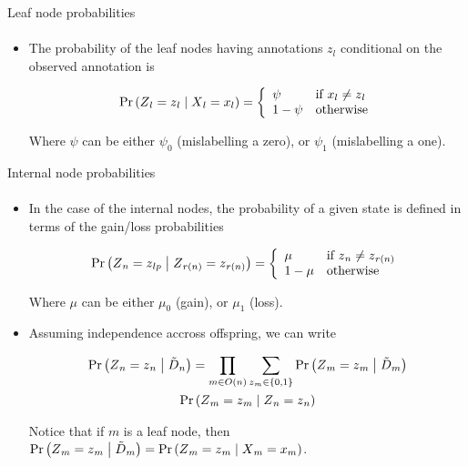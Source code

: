 \documentclass[9pt,handout,ignorenonframetext,]{beamer}
\newcommand{\Prcond}[2]{{\mbox{Pr}\left(#1\vphantom{#2}\;\right|\left.\vphantom{#1}#2\right)}}
\newcommand{\aphylo}{D{}}      %
\newcommand{\aphyloObs}{\tilde \aphylo{}} %
\newcommand{\Ann}{Z{}} %
\newcommand{\ann}{z{}} %
\newcommand{\AnnObs}{X{}}
\newcommand{\annObs}{x{}}
\begin{document}
\begin{frame}[t,label=leafnodesprob]{Leaf node probabilities}

\framesubtitle{\hyperlink{peelingalgorithm}{}}

\begin{itemize}
\item
  The probability of the leaf nodes having annotations \(\ann_l\)
  conditional on the observed annotation is

  \begin{equation}
  \label{eq:leaf1}
  \Prcond{\Ann_{l} = \ann_{l}}{\AnnObs_{l} = \annObs_{l}} = \left\{
  \begin{array}{ll}
  \psi &\mbox{if }\annObs_{l} \neq \ann_{l} \\
  1 - \psi & \mbox{otherwise}
  \end{array}
  \right.
  \end{equation}

  Where \(\psi\) can be either \(\psi_0\) (mislabelling a zero), or
  \(\psi_1\) (mislabelling a one).
\end{itemize}

\end{frame}

\begin{frame}[t,label=internalnodeprob]{Internal node probabilities}

\framesubtitle{\hyperlink{peelingalgorithm}{}}

\begin{itemize}
\item
  In the case of the internal nodes, the probability of a given state is
  defined in terms of the gain/loss probabilities

  \[
  \Prcond{\Ann_{n} = \ann_{lp}}{\Ann_{r(n)} = \ann_{r(n)}} = \left\{
  \begin{array}{ll}
  \mu & \mbox{if }\ann_{n} \neq \ann_{r(n)} \\
  1 - \mu & \mbox{otherwise}
  \end{array}
  \right.
  \]

  Where \(\mu\) can be either \(\mu_0\) (gain), or \(\mu_1\) (loss).
\item
  Assuming independence accross offspring, we can write

  \begin{multline}
  \label{eq:interior1}
  \Prcond{\Ann_n = \ann_n}{\aphyloObs_n} = %
  \prod_{m \in O(n)} \sum_{\ann_m \in \{0,1\}} \Prcond{\Ann_m = \ann_m}{\aphyloObs_m} \\
  \Prcond{\Ann_{m} = \ann_{m}}{\Ann_{n} = \ann_{n}}
  \end{multline}

  Notice that if \(m\) is a leaf node, then
  \(\Prcond{\Ann_m = \ann_m}{\aphyloObs_m} = \Prcond{\Ann_m = \ann_m}{\AnnObs_m = \annObs_m}\).
\end{itemize}

\end{frame}
\end{document}
